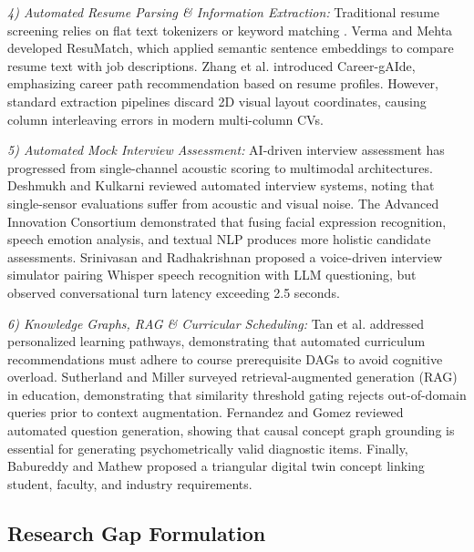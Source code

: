 \documentclass[conference]{IEEEtran}
\begin{document}
\textit{4) Automated Resume Parsing \& Information Extraction:}
Traditional resume screening relies on flat text tokenizers or keyword matching \cite{b9,b10}. Verma and Mehta \cite{b15} developed ResuMatch, which applied semantic sentence embeddings to compare resume text with job descriptions. Zhang et al. \cite{b11} introduced Career-gAIde, emphasizing career path recommendation based on resume profiles. However, standard extraction pipelines discard 2D visual layout coordinates, causing column interleaving errors in modern multi-column CVs.

\textit{5) Automated Mock Interview Assessment:}
AI-driven interview assessment has progressed from single-channel acoustic scoring to multimodal architectures. Deshmukh and Kulkarni \cite{b12} reviewed automated interview systems, noting that single-sensor evaluations suffer from acoustic and visual noise. The Advanced Innovation Consortium \cite{b13} demonstrated that fusing facial expression recognition, speech emotion analysis, and textual NLP produces more holistic candidate assessments. Srinivasan and Radhakrishnan \cite{b19} proposed a voice-driven interview simulator pairing Whisper speech recognition with LLM questioning, but observed conversational turn latency exceeding 2.5 seconds.

\textit{6) Knowledge Graphs, RAG \& Curricular Scheduling:}
Tan et al. \cite{b14} addressed personalized learning pathways, demonstrating that automated curriculum recommendations must adhere to course prerequisite DAGs to avoid cognitive overload. Sutherland and Miller \cite{b18} surveyed retrieval-augmented generation (RAG) in education, demonstrating that similarity threshold gating rejects out-of-domain queries prior to context augmentation. Fernandez and Gomez \cite{b20} reviewed automated question generation, showing that causal concept graph grounding is essential for generating psychometrically valid diagnostic items. Finally, Babureddy and Mathew \cite{b21} proposed a triangular digital twin concept linking student, faculty, and industry requirements.

\subsection{Research Gap Formulation}
\end{document}
